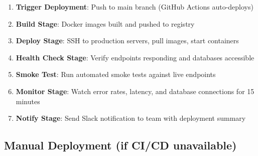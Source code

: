 \documentclass{report}
\begin{document}
\begin{enumerate}
  \item \textbf{Trigger Deployment}: Push to main branch (GitHub Actions auto-deploys)
  \item \textbf{Build Stage}: Docker images built and pushed to registry
  \item \textbf{Deploy Stage}: SSH to production servers, pull images, start containers
  \item \textbf{Health Check Stage}: Verify endpoints responding and databases accessible
  \item \textbf{Smoke Test}: Run automated smoke tests against live endpoints
  \item \textbf{Monitor Stage}: Watch error rates, latency, and database connections for 15 minutes
  \item \textbf{Notify Stage}: Send Slack notification to team with deployment summary
\end{enumerate}

\subsection{Manual Deployment (if CI/CD unavailable)}
\end{document}
